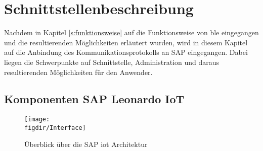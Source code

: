 \section{Schnittstellenbeschreibung}
\label{s:interface} 

\noindent Nachdem in Kapitel \ref{s:funktionsweise} auf die Funktionsweise von \ac{ble} eingegangen und die resultierenden Möglichkeiten erläutert wurden, wird in diesem Kapitel auf die Anbindung des Kommunikationsprotokolls an SAP eingegangen. Dabei liegen die Schwerpunkte auf Schnittstelle, Administration und daraus resultierenden Möglichkeiten für den Anwender.\\

\subsection{Komponenten SAP Leonardo IoT}
\label{ss:interface:sap}

\begin{figure}[!b]
	\centering
	\texttt{[image: \\figdir/Interface]}
	\caption{Überblick über die SAP \ac{iot} Architektur \cite[Seiten 117, 164, 181, 184, 201, 208, 221]{Holtschulte20:IOS}}
	\label{FIG:Interface}
\end{figure}

